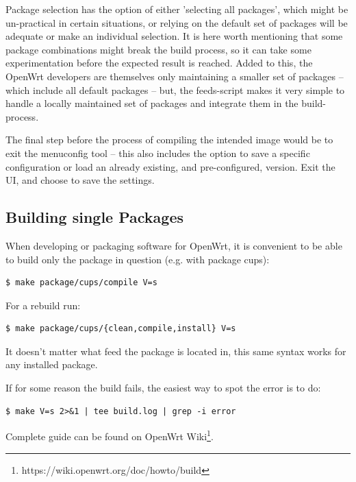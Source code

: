 Package selection has the option of either 'selecting all packages', which might be un-practical in certain situations, or relying on the default set of packages will be adequate or make an individual selection.
It is here worth mentioning that some package combinations might break the build process, so it can take some experimentation before the expected result is reached.
Added to this, the OpenWrt developers are themselves only maintaining a smaller set of packages – which include all default packages – but, the feeds-script makes it very simple to handle a locally maintained set of packages and integrate them in the build-process.

The final step before the process of compiling the intended image would be to exit the menuconfig tool – this also includes the option to save a specific configuration or load an already existing, and pre-configured, version.
Exit the UI, and choose to save the settings\cite{build_owrt}.



\subsection{Building single Packages}

When developing or packaging software for OpenWrt, it is convenient to be able to build only the package in question (e.g. with package cups):
\begin{lstlisting}[columns=fixed,basicstyle=\ttfamily\footnotesize,tabsize=4,backgroundcolor=\color{yellow!10}]
$ make package/cups/compile V=s
\end{lstlisting}
For a rebuild run:
\begin{lstlisting}[columns=fixed,basicstyle=\ttfamily\footnotesize,tabsize=4,backgroundcolor=\color{yellow!10}]
$ make package/cups/{clean,compile,install} V=s
\end{lstlisting}
It doesn't matter what feed the package is located in, this same syntax works for any installed package. %

If for some reason the build fails, the easiest way to spot the error is to do:
\begin{lstlisting}[columns=fixed,basicstyle=\ttfamily\footnotesize,tabsize=4,backgroundcolor=\color{yellow!10}]
$ make V=s 2>&1 | tee build.log | grep -i error
\end{lstlisting}
Complete guide can be found on OpenWrt Wiki\footnote{https://wiki.openwrt.org/doc/howto/build}.
